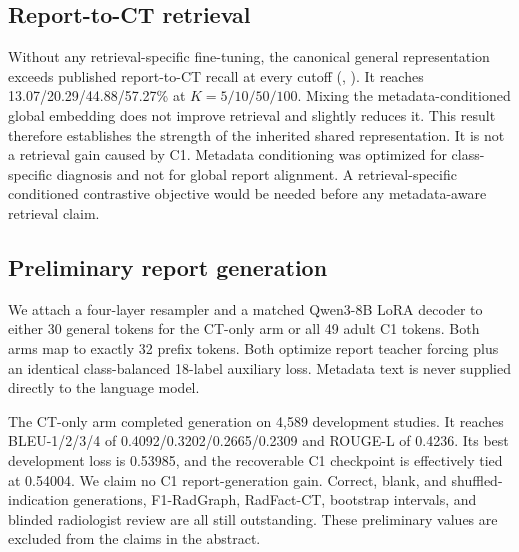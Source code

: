 \documentclass[10pt,twocolumn]{article}
\begin{document}
\subsection{Report-to-CT retrieval}
Without any retrieval-specific fine-tuning, the canonical general
representation exceeds published report-to-CT recall at every cutoff
(, ). It reaches
13.07/20.29/44.88/57.27\% at $K=5/10/50/100$. Mixing the metadata-conditioned
global embedding does not improve retrieval and slightly reduces it. This
result therefore establishes the strength of the inherited shared
representation. It is not a retrieval gain caused by C1. Metadata conditioning
was optimized for class-specific diagnosis and not for global report
alignment. A retrieval-specific conditioned contrastive objective would be
needed before any metadata-aware retrieval claim.

\subsection{Preliminary report generation}
We attach a four-layer resampler and a matched Qwen3-8B LoRA decoder to either
30 general tokens for the CT-only arm or all 49 adult C1 tokens. Both arms map
to exactly 32 prefix tokens. Both optimize report teacher forcing plus an
identical class-balanced 18-label auxiliary loss. Metadata text is never
supplied directly to the language model.

The CT-only arm completed generation on 4,589 development studies. It reaches
BLEU-1/2/3/4 of 0.4092/0.3202/0.2665/0.2309 and ROUGE-L of 0.4236. Its best
development loss is 0.53985, and the recoverable C1 checkpoint is effectively
tied at 0.54004. We claim no C1 report-generation gain. Correct, blank, and
shuffled-indication generations, F1-RadGraph, RadFact-CT, bootstrap intervals,
and blinded radiologist review are all still outstanding. These preliminary
values are excluded from the claims in the abstract.
\end{document}
